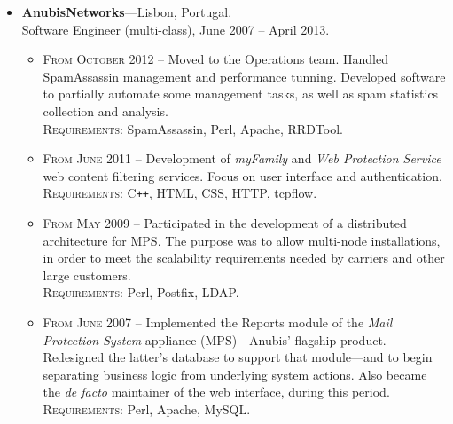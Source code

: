 \documentclass[a4paper,10pt]{extarticle}
\newenvironment{topic}[1]
   {{\noindent\large\bfseries\raisebox{0pt}[\height][1ex]{#1}\hrule\par}%
    \begin{list}{}{%
       \setlength{\leftmargin}{.0cm}}\item[]}
   {\end{list}\medskip}
\begin{document}
\begin{topic}{Professional Experience}
  \begin{itemize}[leftmargin=*]
    \item {\bfseries AnubisNetworks}---Lisbon, Portugal.\\
      Software Engineer (multi-class), June 2007 -- April 2013.
      \begin{itemize}
				\item {\scshape From October 2012} -- Moved to the Operations team. 
					Handled SpamAssassin management and performance tunning. Developed 
					software to partially automate some management tasks, as well as spam 
					statistics collection and analysis.\\
					{\scshape Requirements}: SpamAssassin, Perl, Apache, RRDTool.
				\item {\scshape From June 2011} -- Development of \emph{myFamily} and \emph{Web 
					Protection Service} web content filtering services. Focus on user 
					interface and authentication.\\
					{\scshape Requirements}: C{}\verb!++!, HTML, CSS, HTTP, tcpflow.
				\item {\scshape From May 2009} -- Participated in the development of a distributed 
					architecture for MPS. The purpose was to allow multi-node 
					installations, in order to meet the scalability requirements needed by 
					carriers and other large customers.\\
					{\scshape Requirements}: Perl, Postfix, LDAP.
				\item {\scshape From June 2007} -- Implemented the Reports 
					module of the \emph{Mail Protection 
					System}\textsuperscript{\texttrademark} appliance (MPS)---Anubis' 
					flagship product. Redesigned the latter's database to support that 
					module---and to begin separating business logic from underlying system 
					actions. Also became the \emph{de facto} maintainer of the web 
					interface, during this period.\\
					{\scshape Requirements}: Perl, Apache, MySQL.
      \end{itemize}
  \end{itemize}
\end{topic}
\end{document}
